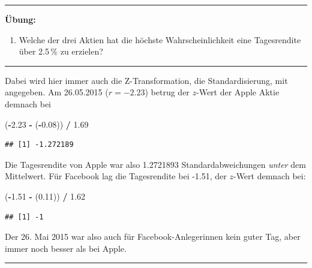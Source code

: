 \documentclass[12pt,ngerman,paper=a4,pagesize,DIV=13]{scrreprt}
\newenvironment{Shaded}{\begin{snugshade}}{\end{snugshade}}
\newcommand{\FloatTok}[1]{\textcolor[rgb]{0.00,0.00,0.81}{#1}}
\newcommand{\NormalTok}[1]{#1}
\newcommand{\OperatorTok}[1]{\textcolor[rgb]{0.81,0.36,0.00}{\textbf{#1}}}
\newcommand{\StringTok}[1]{\textcolor[rgb]{0.31,0.60,0.02}{#1}}
\providecommand{\tightlist}{%
  \setlength{\itemsep}{0pt}\setlength{\parskip}{0pt}}
\begin{document}
\begin{center}\rule{0.5\linewidth}{\linethickness}\end{center}

\textbf{Übung:}

\begin{enumerate}
\def\labelenumi{\arabic{enumi}.}
\setcounter{enumi}{3}
\tightlist
\item
  Welche der drei Aktien hat die höchste Wahrscheinlichkeit eine
  Tagesrendite über 2.5\(\,\)\% zu erzielen?
\end{enumerate}

\begin{center}\rule{0.5\linewidth}{\linethickness}\end{center}

Dabei wird hier immer auch die Z-Transformation, die Standardisierung,
mit angegeben. Am 26.05.2015 (\(r=-2.23\)) betrug der \(z\)-Wert der
Apple Aktie demnach bei

\begin{Shaded}
\begin{Highlighting}[]
\NormalTok{(}\OperatorTok{-}\FloatTok{2.23} \OperatorTok{-}\StringTok{ }\NormalTok{(}\OperatorTok{-}\FloatTok{0.08}\NormalTok{)) }\OperatorTok{/}\StringTok{ }\FloatTok{1.69}
\end{Highlighting}
\end{Shaded}

\begin{verbatim}
## [1] -1.272189
\end{verbatim}

Die Tagesrendite von Apple war also 1.2721893 Standardabweichungen
\emph{unter} dem Mittelwert. Für Facebook lag die Tagesrendite bei
-1.51, der \(z\)-Wert demnach bei:

\begin{Shaded}
\begin{Highlighting}[]
\NormalTok{(}\OperatorTok{-}\FloatTok{1.51} \OperatorTok{-}\StringTok{ }\NormalTok{(}\FloatTok{0.11}\NormalTok{)) }\OperatorTok{/}\StringTok{ }\FloatTok{1.62}
\end{Highlighting}
\end{Shaded}

\begin{verbatim}
## [1] -1
\end{verbatim}

Der 26. Mai 2015 war also auch für Facebook-Anlegerinnen kein guter Tag,
aber immer noch besser als bei Apple.

\begin{center}\rule{0.5\linewidth}{\linethickness}\end{center}
\end{document}
